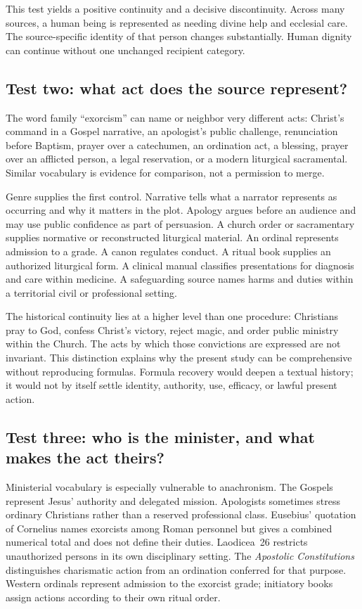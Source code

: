 This test yields a positive continuity and a decisive discontinuity. Across
many sources, a human being is represented as needing divine help and
ecclesial care. The source-specific identity of that person changes
substantially. Human dignity can continue without one unchanged recipient
category.

\subsection{Test two: what act does the source represent?}

The word family ``exorcism'' can name or neighbor very different acts:
Christ's command in a Gospel narrative, an apologist's public challenge,
renunciation before Baptism, prayer over a catechumen, an ordination act, a
blessing, prayer over an afflicted person, a legal reservation, or a modern
liturgical sacramental. Similar vocabulary is evidence for comparison, not a
permission to merge.

Genre supplies the first control. Narrative tells what a narrator represents
as occurring and why it matters in the plot. Apology argues before an
audience and may use public confidence as part of persuasion. A church order
or sacramentary supplies normative or reconstructed liturgical material. An
ordinal represents admission to a grade. A canon regulates conduct. A ritual
book supplies an authorized liturgical form. A clinical manual classifies
presentations for diagnosis and care within medicine. A safeguarding source
names harms and duties within a territorial civil or professional setting.

The historical continuity lies at a higher level than one procedure:
Christians pray to God, confess Christ's victory, reject magic, and order
public ministry within the Church. The acts by which those convictions are
expressed are not invariant. This distinction explains why the present study
can be comprehensive without reproducing formulas. Formula recovery would
deepen a textual history; it would not by itself settle identity, authority,
use, efficacy, or lawful present action.

\subsection{Test three: who is the minister, and what makes the act theirs?}

Ministerial vocabulary is especially vulnerable to anachronism. The Gospels
represent Jesus' authority and delegated mission. Apologists sometimes stress
ordinary Christians rather than a reserved professional class. Eusebius'
quotation of Cornelius names exorcists among Roman personnel but gives a
combined numerical total and does not define their duties. Laodicea~26
restricts unauthorized persons in its own disciplinary setting. The
\emph{Apostolic Constitutions} distinguishes charismatic action from an
ordination conferred for that purpose. Western ordinals represent admission
to the exorcist grade; initiatory books assign actions according to their own
ritual order.

